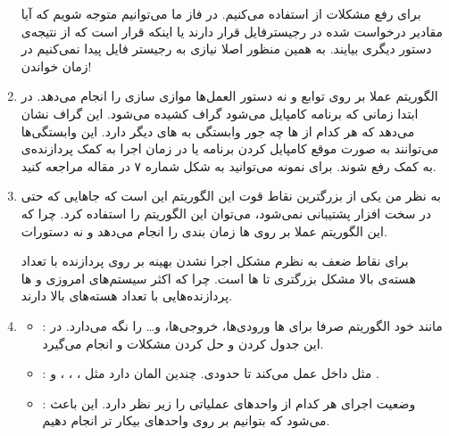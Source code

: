 \begin{enumerate}
    برای رفع مشکلات
    از
    استفاده می‌کنیم. در فاز
    ما می‌توانیم متوجه شویم که آیا مقادیر درخواست شده در رجیسترفایل قرار دارند یا اینکه
    قرار است که از نتیجه‌ی دستور دیگری بیایند. به همین منظور اصلا نیازی به رجیستر فایل پیدا نمی‌کنیم در
    زمان خواندن!
    \item الگوریتم  عملا بر روی توابع و نه دستور العمل‌ها موازی سازی را انجام می‌دهد.
    در ابتدا زمانی که برنامه کامپایل می‌شود گراف
    کشیده می‌شود. این گراف نشان می‌دهد که هر کدام از
    ها
    چه جور وابستگی به
    های
    دیگر دارد. این وابستگی‌ها می‌توانند به صورت
    موقع کامپایل کردن برنامه یا در زمان اجرا به کمک پردازنده‌ی
    به کمک
    رفع شوند. برای نمونه می‌توانید به شکل شماره ۷ در مقاله مراجعه کنید.
    \item به نظر من یکی از بزرگترین نقاط قوت این الگوریتم این است که جاهایی که
    حتی در سخت افزار پشتیبانی نمی‌شود،‌ می‌توان این الگوریتم را استفاده کرد. چرا که این الگوریتم عملا
    بر روی
    ها
    زمان بندی را انجام می‌دهد و نه دستورات.

    برای نقاط ضعف به نظرم مشکل اجرا نشدن بهینه بر روی پردازنده‌ با تعداد هسته‌ی بالا مشکل بزرگتری تا
    ها
    است. چرا که اکثر سیستم‌های امروزی و
    ها
    پردازنده‌هایی با تعداد هسته‌های بالا دارند.
    \item \begin{itemize}
        \item {}: مانند خود الگوریتم 
        صرفا برای
        ها
        ورودی‌ها،‌ خروجی‌ها،
         و\dots
        را نگه می‌دارد. در این جدول
        کردن و حل کردن مشکلات
         و 
        انجام می‌گیرد.
        \item {}: مثل  داخل
        عمل می‌کند تا حدودی. چندین المان دارد مثل
        ،‌ ،‌ ،  و .
        \item {}: وضعیت اجرای هر کدام از واحد‌های عملیاتی را زیر نظر دارد.
        این باعث می‌شود که بتوانیم
        بر روی واحد‌‌های بیکار تر انجام دهیم.
    \end{itemize}
\end{enumerate}